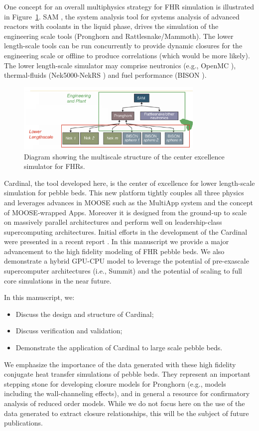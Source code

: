One concept for an overall multiphysics strategy for FHR simulation is illustrated in Figure~\ref{f:fhr1}. SAM \cite{hu2017sam}, the system analysis tool for systems analysis of advanced reactors with coolants in the liquid phase, drives the simulation of the engineering scale tools (Pronghorn and Rattlesnake/Mammoth). The lower length-scale tools can be run concurrently to provide dynamic closures for the engineering scale or offline to produce correlations (which would be more likely). The lower length-scale simulator may comprise neutronics (e.g., OpenMC \cite{romano2013openmc}), thermal-fluids (Nek5000-NekRS \cite{fischer2008}) and fuel performance (BISON \cite{hales2013triso}).

\begin{figure}[!h]
\centering
\includegraphics[clip=true,width=0.8\textwidth]{Figures/fhr_graph}
\caption{Diagram showing the multiscale structure of the center excellence simulator for FHRs.}
\label{f:fhr1}
\end{figure}

Cardinal, the tool developed here, is the center of excellence for lower length-scale simulation for pebble beds. This new platform tightly couples all three physics and leverages advances in MOOSE \cite{gaston2009moose} such as the MultiApp system and the concept of MOOSE-wrapped Apps. Moreover it is designed from the ground-up to scale on massively parallel architectures and perform well on leadership-class supercomputing architectures. Initial efforts in the development of the Cardinal were presented in a recent report \cite{cardinal}. In this manuscript we provide a major advancement to the high fidelity modeling of FHR pebble beds. We also demonstrate a hybrid GPU-CPU model to leverage the potential of pre-exascale supercomputer architectures (i.e., Summit) and the potential of scaling to full core simulations in the near future.

In this manuscript, we:
\begin{itemize}
\item Discuss the design and structure of Cardinal;
\item Discuss verification and validation;
\item Demonstrate the application of Cardinal to large scale pebble beds.
\end{itemize}

We emphasize the importance of the data generated with these high fidelity conjugate heat transfer simulations of pebble beds. They represent an important stepping stone for developing closure models for Pronghorn (e.g., models including the wall-channeling effects), and in general a resource for confirmatory analysis of reduced order models. While we do not focus here on the use of the data generated to extract closure relationships, this will be the subject of future publications.
